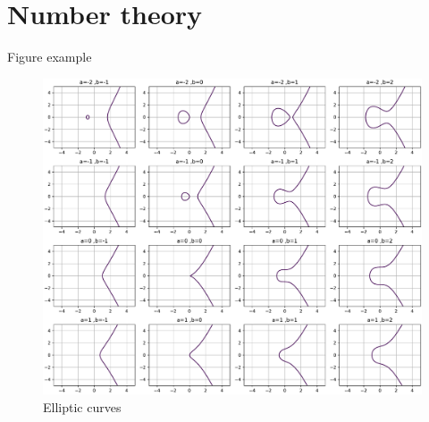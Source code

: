



\section{Number theory}
Figure example
\begin{figure}[!ht]
    \centering
    \includegraphics[width=1\linewidth]{./figure/elliptic_curves.pdf}
    \caption{Elliptic curves \cite{childsUniversalComputationQuantum2009} }
\end{figure}


